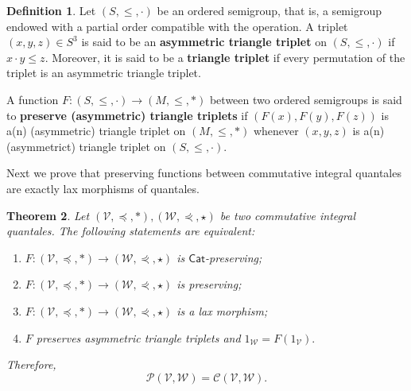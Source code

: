 \documentclass[11pt,a4paper]{amsart}
\newtheorem{theorem}{Theorem}[section]
\theoremstyle{definition}
\newtheorem{definition}[theorem]{Definition}
\begin{document}
	
		\begin{definition}
		Let $(S,\leq,\cdot)$ be an ordered semigroup, that is, a semigroup endowed with a partial order compatible with the operation. A triplet $(x,y,z)\in S^3$ is said to be an \textbf{asymmetric triangle triplet} on $(S,\leq,\cdot)$ if $x\cdot y\leq z.$ Moreover, it is said to be a \textbf{triangle triplet} if every permutation of the triplet is an asymmetric triangle triplet.
		
		A function $F:(S,\leq,\cdot)\to(M,\leqslant,\ast)$ between two ordered semigroups is said to \textbf{preserve (asymmetric) triangle triplets} if $(F(x),F(y),F(z))$ is a(n) (asymmetric) triangle triplet on $(M,\leqslant,\ast)$ whenever $(x,y,z)$  is a(n) (asymmetrict) triangle triplet on $(S,\leq,\cdot).$
	\end{definition}
	
	
%		
	
	Next
	we prove that preserving functions between commutative integral quantales are exactly lax morphisms of quantales. 
	
	\begin{theorem}\label{thm:plmq}
		Let $(\mathscr{V},\preceq,\ast),(\mathscr{W},\curlyeqprec,\star)$ be two commutative integral quantales. The following statements are equivalent:
		\begin{enumerate}[(1)]
			\item $F:(\mathscr{V},\preceq,\ast)\to(\mathscr{W},\curlyeqprec,\star)$ is $\mathsf{Cat}$-preserving; 
			\item  $F:(\mathscr{V},\preceq,\ast)\to(\mathscr{W},\curlyeqprec,\star)$ is preserving; 
			\item $F:(\mathscr{V},\preceq,\ast)\to(\mathscr{W},\curlyeqprec,\star)$ is a lax morphism;
			\item $F$ preserves asymmetric triangle triplets and $1_\mathscr{W}=F(1_\mathscr{V}).$
		\end{enumerate}
		Therefore,
		$$\mathscr{P}(\mathscr{V},\mathscr{W})=\mathscr{C}(\mathscr{V},\mathscr{W}).$$
	\end{theorem}
	
\end{document}
